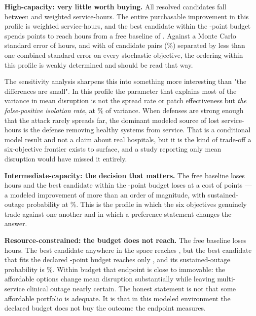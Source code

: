 \textbf{High-capacity: very little worth buying.} All
\ConfirmHighCapacityCandidates{} resolved candidates fall between
\ConfirmHighCapacityMeanLossMin{} and \ConfirmHighCapacityMeanLossMax{}
weighted service-hours. The entire purchasable improvement in this profile is
\ConfirmHighCapacityMaxPurchasableImprovement{} weighted service-hours, and
the best candidate within the \ConfirmHighCapacityBudget-point budget spends
\ConfirmHighCapacityBestAffordableCost{} points to reach
\ConfirmHighCapacityBestAffordableMeanLoss{} hours from a free baseline of
\ConfirmHighCapacityFreeBaselineMeanLoss{}. Against a Monte Carlo standard
error of \ConfirmHighCapacityWorstMeanLossStandardError{} hours, and with
\ConfirmHighCapacityIndistinguishablePairs{} of
\ConfirmHighCapacityCandidatePairs{} candidate pairs
(\ConfirmHighCapacityIndistinguishableShare\%) separated by less than one
combined standard error on every stochastic objective, the ordering within
this profile is weakly determined and should be read that way.

The sensitivity analysis sharpens this into something more interesting than
"the differences are small". In this profile the parameter that explains most
of the variance in mean disruption is not the spread rate or patch
effectiveness but \emph{the false-positive isolation rate}, at
\SensitivityHighCapacityDominantEffect\% of variance. When defenses are
strong enough that the attack rarely spreads far, the dominant modeled source
of lost service-hours is the defense removing healthy systems from service.
That is a conditional model result and not a claim about real hospitals, but
it is the kind of trade-off a six-objective frontier exists to surface, and a
study reporting only mean disruption would have missed it entirely.

\textbf{Intermediate-capacity: the decision that matters.} The free baseline
loses \ConfirmIntermediateFreeBaselineMeanLoss{} hours and the best candidate
within the \ConfirmIntermediateBudget-point budget loses
\ConfirmIntermediateBestAffordableMeanLoss{} at a cost of
\ConfirmIntermediateBestAffordableCost{} points --- a modeled improvement of
more than an order of magnitude, with sustained-outage probability at
\ConfirmIntermediateBestAffordableOutage\%. This is the profile in which the
six objectives genuinely trade against one another and in which a preference
statement changes the answer.

\textbf{Resource-constrained: the budget does not reach.} The free baseline
loses \ConfirmResourceConstrainedFreeBaselineMeanLoss{} hours. The best
candidate anywhere in the space reaches
\ConfirmResourceConstrainedMeanLossMin{}, but the best candidate that fits
the declared \ConfirmResourceConstrainedBudget-point budget reaches only
\ConfirmResourceConstrainedBestAffordableMeanLoss{}, and its sustained-outage
probability is \ConfirmResourceConstrainedBestAffordableOutage\%. Within
budget that endpoint is close to immovable: the affordable options change
mean disruption substantially while leaving multi-service clinical outage
nearly certain. The honest statement is not that some affordable portfolio is
adequate. It is that in this modeled environment the declared budget does not
buy the outcome the endpoint measures.


